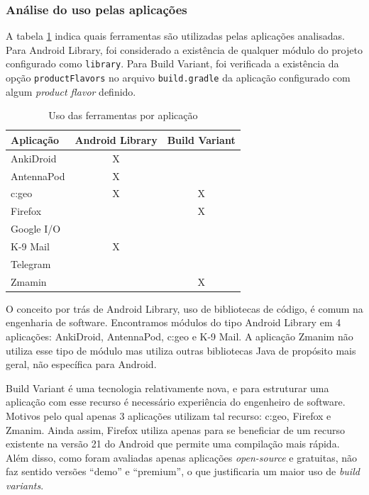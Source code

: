 \subsubsection{Análise do uso pelas aplicações}
A tabela \ref{tab:uso_ferramentas} indica quais ferramentas são utilizadas pelas
aplicações analisadas. Para Android Library, foi considerado a existência de qualquer
módulo do projeto configurado como \texttt{library}. Para Build Variant, foi verificada a
existência da opção \texttt{productFlavors} no arquivo \texttt{build.gradle} da
aplicação configurado com algum \textit{product flavor} definido.

\begin{table}[ht]
\centering
\caption{Uso das ferramentas por aplicação}
\label{tab:uso_ferramentas}
\begin{tabular}{|l|c|c|}
\hline
\textbf{Aplicação} & \textbf{Android Library} & \textbf{Build Variant} \\ \hline
AnkiDroid          & X                        &                        \\ \hline
AntennaPod         & X                        &                        \\ \hline
c:geo              & X                        & X                      \\ \hline
Firefox            &                          & X                      \\ \hline
Google I/O         &                          &                        \\ \hline
K-9 Mail           & X                        &                        \\ \hline
Telegram           &                          &                        \\ \hline
Zmamin             &                          & X                      \\ \hline
\end{tabular}
\end{table}

O conceito por trás de Android Library, uso de bibliotecas de código, é comum na
engenharia de software. Encontramos módulos do tipo Android Library em 4 aplicações:
AnkiDroid, AntennaPod, c:geo e K-9 Mail.
A aplicação Zmanim não utiliza esse tipo de módulo mas utiliza outras bibliotecas
Java de propósito mais geral, não específica para Android.

Build Variant é uma tecnologia relativamente nova, e para estruturar uma aplicação
com esse recurso é necessário experiência do engenheiro de software. Motivos pelo
qual apenas 3 aplicações utilizam tal recurso: c:geo, Firefox e Zmanim.
Ainda assim, Firefox utiliza apenas
para se beneficiar de um recurso existente na versão 21 do Android que permite
uma compilação mais rápida. Além disso, como foram avaliadas apenas aplicações
\textit{open-source} e gratuitas, não faz sentido versões “demo” e “premium”,
o que justificaria um maior uso de \textit{build variants}.


